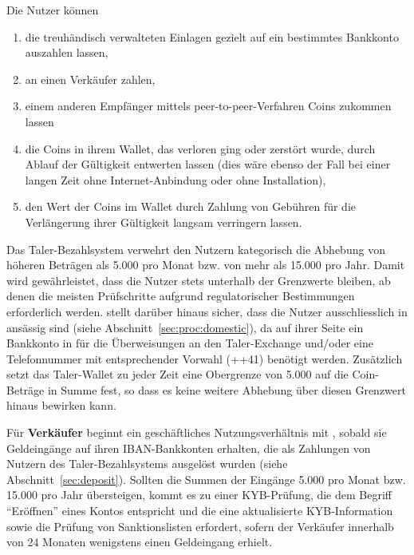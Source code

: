 \documentclass[10pt,a4paper,oneside]{book}
\begin{document}
Die Nutzer k\"onnen
\begin{enumerate}[noitemsep]
\item die treuh\"andisch verwalteten Einlagen gezielt auf ein bestimmtes
Bankkonto auszahlen lassen,
\item an einen Verk\"aufer zahlen,
\item einem anderen Empf\"anger mittels peer-to-peer-Verfahren Coins zukommen
lassen
\item die Coins in ihrem Wallet, das verloren ging oder zerst\"ort wurde,
durch Ablauf der G\"ultigkeit entwerten lassen (dies w\"are ebenso der Fall
bei einer langen Zeit ohne Internet-Anbindung oder ohne Installation),
\item den Wert der Coins im Wallet durch Zahlung von Geb\"uhren f\"ur
die Verl\"angerung ihrer G\"ultigkeit langsam verringern lassen.
\end{enumerate}

Das Taler-Bezahlsystem verwehrt den Nutzern kategorisch die Abhebung
von h\"oheren Betr\"agen als 5.000 \CURRENCY{} pro Monat bzw. von
mehr als 15.000 \CURRENCY{} pro Jahr. Damit wird gew\"ahrleistet,
dass die Nutzer stets unterhalb der Grenzwerte bleiben, ab denen die
meisten Pr\"ufschritte aufgrund regulatorischer Bestimmungen erforderlich
werden. \TALER{} stellt dar\"uber hinaus sicher, dass die Nutzer
ausschliesslich in \LAND{} ans\"assig sind
(siehe Abschnitt~\ref{sec:proc:domestic}), da auf ihrer Seite ein Bankkonto
in \LAND{} f\"ur die \"Uberweisungen an den Taler-Exchange und/oder
eine Telefonnummer mit entsprechender Vorwahl (++41) ben\"otigt werden.
Zus\"atzlich setzt das Taler-Wallet zu jeder Zeit eine Obergrenze
von 5.000 \CURRENCY{} auf die Coin-Betr\"age in Summe fest, so dass es
keine weitere Abhebung \"uber diesen Grenzwert hinaus bewirken kann.

F\"ur {\bf Verk\"aufer} beginnt ein gesch\"aftliches Nutzungsverh\"altnis
mit \TALER{}, sobald sie Geldeing\"ange auf ihren IBAN-Bankkonten erhalten,
die als Zahlungen von Nutzern des Taler-Bezahlsystems ausgel\"ost wurden
(siehe Abschnitt~\ref{sec:deposit}). Sollten die Summen der Eing\"ange
5.000 \CURRENCY{} pro Monat bzw. 15.000 \CURRENCY{} pro Jahr \"ubersteigen,
kommt es zu einer KYB-Pr\"ufung, die dem Begriff ``Er\"offnen'' eines
Kontos entspricht und die eine aktualisierte KYB-Information sowie
die Pr\"ufung von Sanktionslisten erfordert, sofern der Verk\"aufer
innerhalb von 24 Monaten wenigstens einen Geldeingang erhielt.
\end{document}
